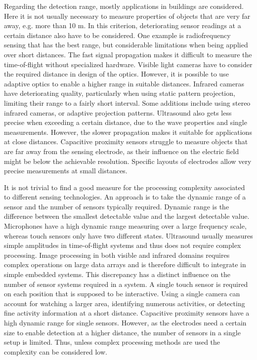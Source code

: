 Regarding the detection range, mostly applications in buildings are considered. Here it is not usually necessary to measure properties of objects that are very far away, e.g. more than 10 m. In this criterion, deteriorating sensor readings at a certain distance also have to be considered. One example is radiofrequency sensing that has the best range, but considerable limitations when being applied over short distances. The fast signal propagation makes it difficult to measure the time-of-flight without specialized hardware. Visible light cameras have to consider the required distance in design of the optics. However, it is possible to use adaptive optics to enable a higher range in suitable distances. Infrared cameras have deteriorating quality, particularly when using static pattern projection, limiting their range to a fairly short interval. Some additions include using stereo infrared cameras, or adaptive projection patterns. Ultrasound also gets less precise when exceeding a certain distance, due to the wave properties and single measurements. However, the slower propagation makes it suitable for applications at close distances. Capacitive proximity sensors struggle to measure objects that are far away from the sensing electrode, as their influence on the electric field might be below the achievable resolution. Specific layouts of electrodes allow very precise measurements at small distances.

It is not trivial to find a good measure for the processing complexity associated to different sensing technologies. An approach is to take the dynamic range of a sensor and the number of sensors typically required. Dynamic range is the difference between the smallest detectable value and the largest detectable value. Microphones have a high dynamic range measuring over a large frequency scale, whereas touch sensors only have two different states. Ultrasound usually measures simple amplitudes in time-of-flight systems and thus does not require complex processing. Image processing in both visible and infrared domains requires complex operations on large data arrays and is therefore difficult to integrate in simple embedded systems. This discrepancy has a distinct influence on the number of sensor systems required in a system. A single touch sensor is required on each position that is supposed to be interactive. Using a single camera can account for watching a larger area, identifying numerous activities, or detecting fine activity information at a short distance. Capacitive proximity sensors have a high dynamic range for single sensors. However, as the electrodes need a certain size to enable detection at a higher distance, the number of sensors in a single setup is limited. Thus, unless complex processing methods are used the complexity can be considered low.

